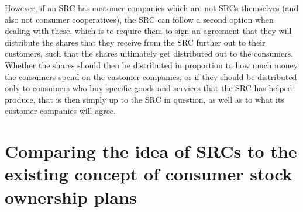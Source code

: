 \documentclass{article}
\begin{document}
However, if an SRC has customer companies which are not SRCs themselves (and also not consumer cooperatives), the SRC can follow a second option when dealing with these, %
which is to require them to sign an agreement that they will distribute the shares that they receive from the SRC further out to their customers, such that the shares ultimately get distributed out to the consumers. Whether the shares should then be distributed in proportion to how much money the consumers spend on the customer companies, or if they should be distributed only to consumers who buy specific goods and services that the SRC has helped produce, that is then simply up to the SRC in question, as well as to what its customer companies will agree.







\section{Comparing the idea of SRCs to the existing concept of consumer stock ownership plans}

\end{document}
